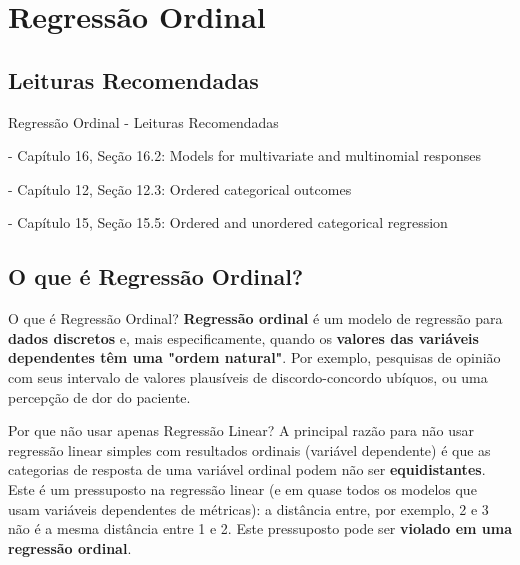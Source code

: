 \section{Regressão Ordinal}

\subsection{Leituras Recomendadas}
\begin{frame}{Regressão Ordinal - Leituras Recomendadas}
	\begin{vfilleditems}
		\item \textcite{gelman2013bayesian} - Capítulo 16, Seção 16.2: Models for multivariate and multinomial responses
		\item \textcite{mcelreath2020statistical} - Capítulo 12, Seção 12.3: Ordered categorical outcomes
		\item \textcite{gelman2020regression} - Capítulo 15, Seção 15.5: Ordered and unordered categorical regression
		\item \textcite{Burkner_Vuorre_2019}
		\item \textcite{Semenova_2019}
	\end{vfilleditems}
\end{frame}

\subsection{O que é Regressão Ordinal?}
\begin{frame}{O que é Regressão Ordinal?}
	\textbf{Regressão ordinal} é um modelo de regressão para \textbf{dados discretos} e,
	mais especificamente, quando os \textbf{valores das variáveis dependentes têm uma "ordem natural"}.
	\vfill
	Por exemplo, pesquisas de opinião com seus intervalo de valores plausíveis de discordo-concordo ubíquos,
	ou uma percepção de dor do paciente.
\end{frame}
\begin{frame}{Por que não usar apenas Regressão Linear?}
	A principal razão para não usar regressão linear simples com resultados ordinais (variável dependente) é
	que as categorias de resposta de uma variável ordinal podem não ser \textbf{equidistantes}.
	Este é um pressuposto na regressão linear (e em quase todos os modelos que usam variáveis dependentes de métricas):
	a distância entre, por exemplo, 2 e 3 não é a mesma distância entre 1 e 2.
	\vfill
	Este pressuposto pode ser \textbf{violado em uma regressão ordinal}.
\end{frame}

